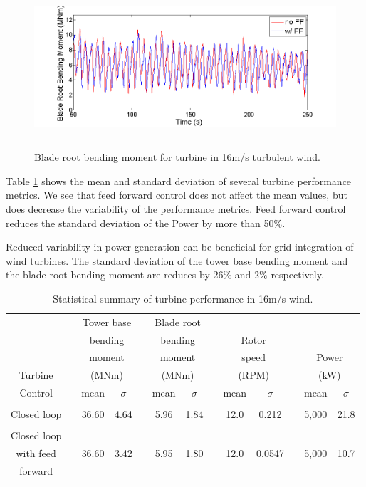 \begin{figure}[htbp]
	\centering
		\includegraphics[trim = {1cm 0 2cm 0}, clip, width = \linewidth]{Figures/ch3Figures/fig3-23.png}
		\rule{35em}{0.5pt}
	\caption{Blade root bending moment for turbine in 16m/s turbulent wind.}
	\label{fig3-23}
\end{figure}

Table \ref{Table3-2} shows the mean and standard deviation of several turbine performance metrics. We see that feed forward control does not affect the mean values, but does decrease the variability of the performance metrics. Feed forward control reduces the standard deviation of the Power by more than 50$\%$. 

Reduced variability in power generation can be beneficial for grid integration of wind turbines. The standard deviation of the tower base bending moment and the blade root bending moment are reduces by 26$\%$ and 2$\%$ respectively. 

\begin{table}
\caption{Statistical summary of turbine performance in 16m/s wind.}
\centering
\begin{tabular}{ c | c c c c c c c c c c c c}
\hline
\hline
	& & \multicolumn{2}{c}{Tower base}	& & \multicolumn{2}{c}{Blade root}		& & \\
	& & \multicolumn{2}{c}{bending}	& & \multicolumn{2}{c}{bending}		& &\multicolumn{2}{c}{Rotor}	& & \\
	& & \multicolumn{2}{c}{moment}	& & \multicolumn{2}{c}{moment}		& &\multicolumn{2}{c}{speed}		& &\multicolumn{2}{c}{Power} \\	
Turbine					& & \multicolumn{2}{c}{(MNm)}  					& & \multicolumn{2}{c}{(MNm)}	& & \multicolumn{2}{c}{(RPM)}	& & \multicolumn{2}{c}{(kW)}\\
\cline{3-4} \cline{6-7} \cline{9-10} \cline{12-13} 
Control & & mean & $\sigma$ & & mean & $\sigma$ & & mean & $\sigma$  & & mean & $\sigma$ \\
\hline
\\
Closed loop & & 36.60 & 4.64  & & 5.96 & 1.84  && 12.0 & 0.212&& 5,000  & 21.8 \\
 \\
Closed loop \\
with feed   & & 36.60 & 3.42  & & 5.95 & 1.80 && 12.0 & 0.0547  && 5,000  & 10.7 \\
forward\\
\hline
\hline
\end{tabular}
\label{Table3-2}
\end{table}


